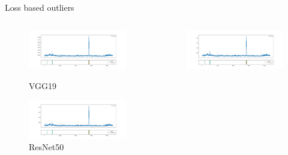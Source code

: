 \documentclass[aspectratio=169]{beamer}
\begin{document}
\begin{frame}{Loss based outliers}
    \begin{columns}
        \begin{column}{0.45\textwidth}
            \begin{figure}
                \centering
                \includegraphics[width=\columnwidth,trim={0 0 0 1cm},clip]{./results/vgg19_vgg19/20230510_172958_feature_vectors_loss.png}
                \caption*{VGG19}
                \includegraphics[width=\columnwidth,trim={0 0 0 1cm},clip]{./results/resnet50_vgg19/20230514_213740_feature_vectors_loss.png}
                \caption*{ResNet50}
            \end{figure}
        \end{column}
        \begin{column}{0.45\textwidth}
            \begin{figure}
                \centering
                \includegraphics[width=\columnwidth,trim={0 0 0 1cm},clip]{./results/vgg19_bn_vgg19/20230525_045131_feature_vectors_loss.png}

\end{figure}
\end{column}
\end{columns}
\end{frame}
\end{document}
